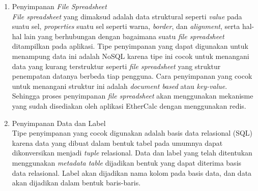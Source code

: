 	\begin{enumerate}
		\item Penyimpanan \textit{File Spreadsheet} \\
		\textit{File spreadsheet} yang dimaksud adalah data struktural seperti \textit{value} pada suatu sel, \textit{properties} suatu sel seperti warna, \textit{border}, dan \textit{alignment}, serta hal-hal lain yang berhubungan dengan bagaimana suatu \textit{file spreadsheet} ditampilkan pada aplikasi. Tipe penyimpanan yang dapat digunakan untuk menampung data ini adalah NoSQL karena tipe ini cocok untuk menangani data yang kurang terstruktur seperti \textit{file spreadsheet} yang struktur penempatan datanya berbeda tiap pengguna. Cara penyimpanan yang cocok untuk menangani struktur ini adalah \textit{document based} atau \textit{key-value}. Sehingga proses penyimpanan \textit{file spreadsheet} akan menggunakan mekanisme yang sudah disediakan oleh aplikasi EtherCalc dengan menggunakan redis.

		\item Penyimpanan Data dan Label \\
		Tipe penyimpanan yang cocok digunakan adalah basis data relasional (SQL) karena data yang dibuat dalam bentuk tabel pada umumnya dapat dikonversikan menjadi \textit{tuple} relasional. Data dan label yang telah ditentukan menggunakan \textit{metadata table} dijadikan bentuk yang dapat diterima basis data relasional. Label akan dijadikan nama kolom pada basis data, dan data akan dijadikan dalam bentuk baris-baris.



	\end{enumerate}

